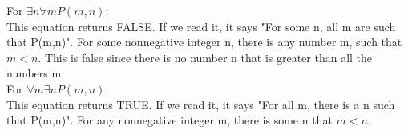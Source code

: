 \documentclass[12pt]{article}
\begin{document}
\begin{enumerate}
\begin{enumerate}
For $\exists n \forall m P(m, n)$:
\\This equation returns FALSE. If we read it, it says "For some n, all m are such that P(m,n)". For some nonnegative integer n, there is any number m, such that $m < n$. This is false since there is no number n that is greater than all the numbers m.\\

For $\forall m \exists n P(m, n)$:
\\This equation returns TRUE. If we read it, it says "For all m, there is a n such that P(m,n)". For any nonnegative integer m, there is some n that $m < n$.



\end{enumerate}

\end{enumerate}
\end{document}
